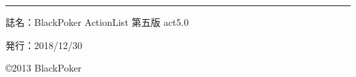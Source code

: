 \documentclass[twocolumn,a5paper,papersize,10pt]{jarticle}
\begin{document}
\thispagestyle{empty}
\begin{flushright}
\begin{minipage}{0.8\hsize}
\hrule height 0.2mm depth 0mm width 50mm %
\begin{description}
  \item{誌名：}BlackPoker ActionList 第五版 act5.0
  \item{発行：}2018/12/30
\end{description}
\end{minipage}
\end{flushright}

\begin{flushright}
\copyright 2013 BlackPoker
\end{flushright}
\end{document}
